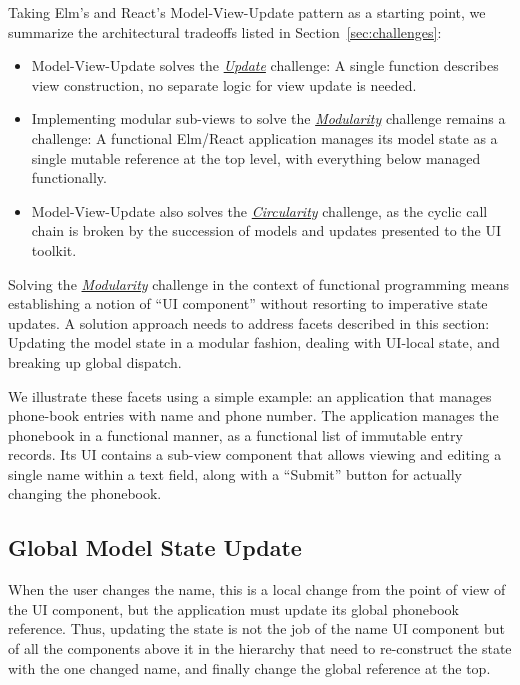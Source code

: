 \documentclass[sigplan,review,screen]{acmart}
\begin{document}
Taking Elm's and React's Model-View-Update pattern as a starting
point, we summarize the architectural tradeoffs listed in
Section~\ref{sec:challenges}:
%
\begin{itemize}
\item Model-View-Update solves the \hyperlink{challenge:update}{\textit{Update}} challenge: A single function
  describes view construction, no separate logic for view update is
  needed.
\item Implementing modular sub-views to solve the \hyperlink{challenge:modularity}{\textit{Modularity}} challenge remains a challenge:
  A functional Elm/React application manages its model
  state as a single mutable reference at the top level, with
  everything below managed functionally.
\item Model-View-Update also solves the \hyperlink{challenge:circularity}{\textit{Circularity}} challenge, as the cyclic call
  chain is broken by the succession of models and updates
  presented to the UI toolkit.
\end{itemize}
%
Solving the \hyperlink{challenge:modularity}{\textit{Modularity}} challenge in the context of functional programming
means establishing a notion of ``UI
component'' without resorting to imperative state updates.  A solution
approach needs to address facets described in this section: Updating
the model state in a modular fashion, dealing with UI-local state, and
breaking up global dispatch.

We illustrate these facets using a simple example: an
application that manages phone-book entries with name and phone
number.  The application manages the phonebook in a functional
manner, as a functional list of immutable entry records.  Its UI
contains a sub-view component that allows viewing and editing a single
name within a text field, along with a ``Submit'' button for actually
changing the phonebook.


\subsection{Global Model State Update}

When the user changes the name, this is a local change from the point
of view of the UI component, but 
the application must update its global phonebook reference.  Thus,
updating the state is not the job of the name UI component
but of all the components above it in the hierarchy that need to
re-construct the state with the one changed name, and finally change
the global reference at the top.
\end{document}
